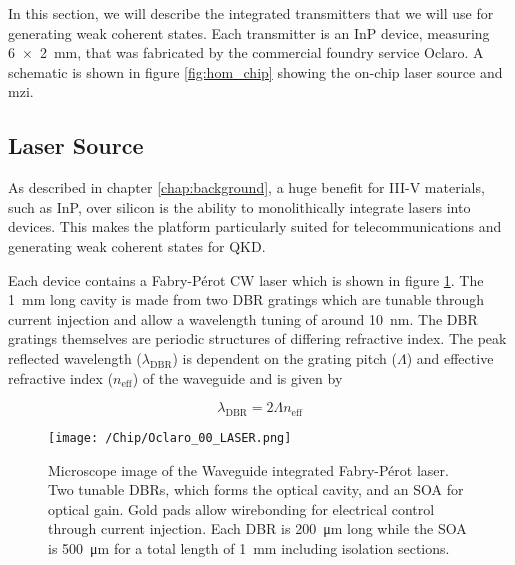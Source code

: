 In this section, we will describe the integrated transmitters that we will use for generating weak coherent states. Each transmitter is an \ac{InP} device, measuring \SI{6x2}{mm}, that was fabricated by the commercial foundry service Oclaro. A schematic is shown in figure \ref{fig:hom_chip} showing the on-chip laser source and \ac{mzi}.

\subsection{Laser Source}

As described in chapter \ref{chap:background}, a huge benefit for {III-V} materials, such as \ac{InP}, over silicon is the ability to monolithically integrate lasers into devices. This makes the platform particularly suited for telecommunications and generating weak coherent states for \ac{QKD}. 


Each device contains a Fabry-P\'{e}rot \ac{CW} laser which is shown in figure \ref{fig:InP_laser}. The \SI{1}{mm} long cavity is made from two \ac{DBR} gratings which are tunable through current injection and allow a wavelength tuning of around \SI{10}{nm}. The \ac{DBR} gratings themselves are periodic structures of differing refractive index. The peak reflected wavelength ($\lambda_\text{DBR}$) is dependent on the grating pitch ($\Lambda$) and effective refractive index ($n_\text{eff}$) of the waveguide and is given by

\begin{equation}
	\lambda_\text{DBR} = 2\Lambda n_\text{eff}
\end{equation}

\begin{figure}[t]
	\centering
	\texttt{[image: /Chip/Oclaro\_00\_LASER.png]}
	\caption[Microscope image of the waveguide integrated Fabry-P\'{e}rot laser]{Microscope image of the Waveguide integrated Fabry-P\'{e}rot laser. Two tunable \acsp{DBR}, which forms the optical cavity, and an \acs{SOA} for optical gain. Gold pads allow wirebonding for electrical control through current injection. Each \acs{DBR} is \SI{200}{\um} long while the \acs{SOA} is \SI{500}{\um} for a total length of \SI{1}{\mm} including isolation sections.}
	\label{fig:InP_laser}
\end{figure}

